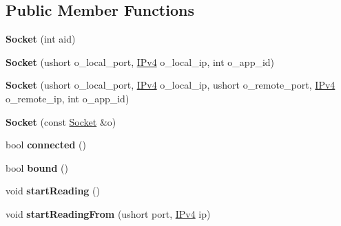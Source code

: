 \subsection*{Public Member Functions}
\begin{DoxyCompactItemize}
\item 
{\bfseries Socket} (int aid)\hypertarget{structudp_1_1Socket_af970d688bc9492294402136069f9deab}{}\label{structudp_1_1Socket_af970d688bc9492294402136069f9deab}

\item 
{\bfseries Socket} (ushort o\+\_\+local\+\_\+port, \hyperlink{structIPv4}{I\+Pv4} o\+\_\+local\+\_\+ip, int o\+\_\+app\+\_\+id)\hypertarget{structudp_1_1Socket_ae9419b8ecda7eb7862991fa114243004}{}\label{structudp_1_1Socket_ae9419b8ecda7eb7862991fa114243004}

\item 
{\bfseries Socket} (ushort o\+\_\+local\+\_\+port, \hyperlink{structIPv4}{I\+Pv4} o\+\_\+local\+\_\+ip, ushort o\+\_\+remote\+\_\+port, \hyperlink{structIPv4}{I\+Pv4} o\+\_\+remote\+\_\+ip, int o\+\_\+app\+\_\+id)\hypertarget{structudp_1_1Socket_a9d54379d1f4fa64928070142ad04267c}{}\label{structudp_1_1Socket_a9d54379d1f4fa64928070142ad04267c}

\item 
{\bfseries Socket} (const \hyperlink{structudp_1_1Socket}{Socket} \&o)\hypertarget{structudp_1_1Socket_abf163ce63fbd305ed2593996b52c3737}{}\label{structudp_1_1Socket_abf163ce63fbd305ed2593996b52c3737}

\item 
bool {\bfseries connected} ()\hypertarget{structudp_1_1Socket_a176759a6b6a7423af91341f72a979bfc}{}\label{structudp_1_1Socket_a176759a6b6a7423af91341f72a979bfc}

\item 
bool {\bfseries bound} ()\hypertarget{structudp_1_1Socket_a0374f88bf7dfc202518c06e9056ccb3c}{}\label{structudp_1_1Socket_a0374f88bf7dfc202518c06e9056ccb3c}

\item 
void {\bfseries start\+Reading} ()\hypertarget{structudp_1_1Socket_a375f5ff098b53082a034563b18cebf08}{}\label{structudp_1_1Socket_a375f5ff098b53082a034563b18cebf08}

\item 
void {\bfseries start\+Reading\+From} (ushort port, \hyperlink{structIPv4}{I\+Pv4} ip)\hypertarget{structudp_1_1Socket_a56dffa316e5cb39326e418ff1bb92cf0}{}\label{structudp_1_1Socket_a56dffa316e5cb39326e418ff1bb92cf0}


\end{DoxyCompactItemize}
